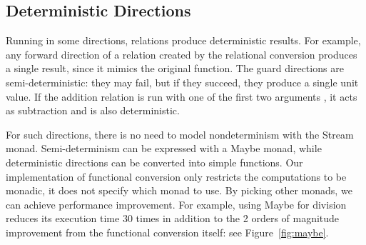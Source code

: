 

\subsection{Deterministic Directions}

Running in some directions, relations produce deterministic results.
For example, any forward direction of a relation created by the relational conversion produces a single result, since it mimics the original function.
The guard directions are semi-deterministic: they may fail, but if they succeed, they produce a single unit value.
If the addition relation is run with one of the first two arguments \outm, it acts as subtraction and is also deterministic.

For such directions, there is no need to model nondeterminism with the Stream monad.
Semi-determinism can be expressed with a Maybe monad, while deterministic directions can be converted into simple functions.
Our implementation of functional conversion only restricts the computations to be monadic, it does not specify which monad to use.
By picking other monads, we can achieve performance improvement.
For example, using Maybe for division reduces its execution time $30$ times in addition to the 2 orders of magnitude improvement from the functional conversion itself: see Figure~\ref{fig:maybe}.

